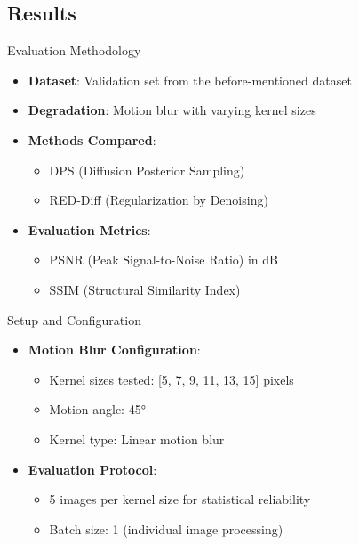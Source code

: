 \subsection{Results}

\begin{frame}{Evaluation Methodology}
    \begin{itemize}
        \item \textbf{Dataset}: Validation set from the before-mentioned dataset
        \item \textbf{Degradation}: Motion blur with varying kernel sizes
        \item \textbf{Methods Compared}:
        \begin{itemize}
            \item DPS (Diffusion Posterior Sampling)
            \item RED-Diff (Regularization by Denoising)
        \end{itemize}
        \item \textbf{Evaluation Metrics}:
        \begin{itemize}
            \item PSNR (Peak Signal-to-Noise Ratio) in dB
            \item SSIM (Structural Similarity Index)
        \end{itemize}
    \end{itemize}
\end{frame}

\begin{frame}{Setup and Configuration}
    \begin{itemize}
        \item \textbf{Motion Blur Configuration}:
              \begin{itemize}
                  \item Kernel sizes tested: [5, 7, 9, 11, 13, 15] pixels
                  \item Motion angle: 45°
                  \item Kernel type: Linear motion blur
              \end{itemize}
        \item \textbf{Evaluation Protocol}:
              \begin{itemize}
                  \item 5 images per kernel size for statistical reliability
                  \item Batch size: 1 (individual image processing)
              \end{itemize}
    \end{itemize}
\end{frame}


